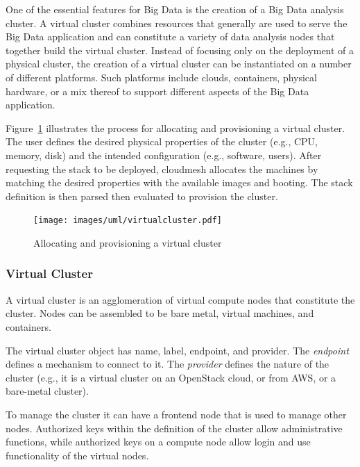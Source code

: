 \documentclass[10pt]{article}
\begin{document}
One of the essential features for Big Data is the creation of a Big
Data analysis cluster. A virtual cluster combines resources that
generally are used to serve the Big Data application and can constitute
a variety of data analysis nodes that together build the virtual
cluster. Instead of focusing only on the deployment of a physical
cluster, the creation of a virtual cluster can be instantiated on a
number of different platforms. Such platforms include clouds,
containers, physical hardware, or a mix thereof to support different
aspects of the Big Data application. 

Figure~\ref{F:uml-virtualcluster} illustrates the process for
allocating and provisioning a virtual cluster. The user defines the
desired physical properties of the cluster (e.g., CPU, memory, disk) and
the intended configuration (e.g., software, users). After
requesting the stack to be deployed, cloudmesh allocates the machines
by matching the desired properties with the available
images and booting. The stack definition is then parsed then evaluated
to provision the cluster.


\begin{figure}[!h]
\centering
\texttt{[image: images/uml/virtualcluster.pdf]}
\caption{Allocating and provisioning a virtual cluster}\label{F:uml-virtualcluster}
\end{figure}


\subsubsection{Virtual Cluster}

A virtual cluster is an agglomeration of virtual compute nodes that
constitute the cluster. Nodes can be assembled to be bare metal,
virtual machines, and containers.  

The virtual cluster object has name, label, endpoint, and provider. The
\textit{endpoint} defines a mechanism to connect to it. The
\textit{provider} defines the nature of the cluster (e.g., it is a
virtual cluster on an OpenStack cloud, or from AWS, or a bare-metal
cluster).

To manage the cluster it can have a frontend node that is used to
manage other nodes. Authorized keys within the definition of the
cluster allow administrative functions, while authorized keys on a
compute node allow login and use functionality of the virtual nodes.

\end{document}
